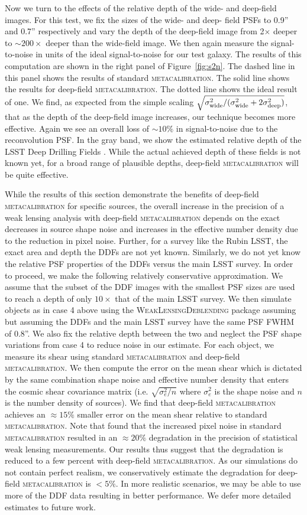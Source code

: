 \documentclass[twocolumn]{openjournal}
\makeatletter
\newcommand{\mcal}{\textsc{metacalibration}\@\xspace}
\newcommand{\descwl}{\textsc{WeakLensingDeblending}\@\xspace}
\makeatother
\begin{document}
Now we turn to the effects of the relative depth of the wide- and deep-field images. For
this test, we fix the sizes of the wide- and deep- field PSFs to 0.9'' and 0.7''
respectively and vary the depth of the deep-field image from 2$\times$ deeper to
$\sim200\times$ deeper than the wide-field image. We then again measure the
signal-to-noise in units of the ideal signal-to-noise for our test galaxy. The results
of this computation are shown in the right panel of Figure~\ref{fig:s2n}. The dashed
line in this panel shows the results of standard \mcal. The solid line shows the results
for deep-field \mcal. The dotted line shows the ideal result of one. We find, as
expected from the simple scaling
$\sqrt{\sigma^2_{\rm wide}/(\sigma^2_{\rm wide} + 2\sigma^2_{\rm deep})}$,
that as the depth of the deep-field image increases, our
technique becomes more effective. Again we see an overall loss of $\sim10\%$ in
signal-to-noise due to the reconvolution PSF. In the gray band, we show the estimated
relative depth of the LSST Deep Drilling Fields \citep[DDF,][]{lsst-ddf-depth}. While
the actual achieved depth of these fields is not known yet, for a broad range of
plausible depths, deep-field \mcal will be quite effective.

While the results of this section demonstrate the benefits of deep-field \mcal for
specific sources, the overall increase in the precision of a weak lensing analysis with
deep-field \mcal depends on the exact decreases in source shape noise and increases in
the effective number density due to the reduction in pixel noise. Further, for a survey
like the Rubin LSST, the exact area and depth the DDFs are not yet known. Similarly, we
do not yet know the relative PSF properties of the DDFs versus the main LSST survey. In
order to proceed, we make the following relatively conservative approximation. We assume
that the subset of the DDF images with the smallest PSF sizes are used to reach a depth
of only $10\times$ that of the main LSST survey. We then simulate objects as in case 4
above using the \descwl package assuming but assuming the DDFs and the main LSST survey
have the same PSF FWHM of 0.8''. We also fix the relative depth between the two and
neglect the PSF shape variations from case 4 to reduce noise in our estimate. For each
object, we measure its shear using standard \mcal and deep-field \mcal. We then compute
the error on the mean shear which is dictated by the same combination shape noise and
effective number density that enters the cosmic shear covariance matrix (i.e.
$\sqrt{\sigma_e^2/n}$ where $\sigma_e^2$ is the shape noise and $n$ is the number density
of sources). We find that deep-field \mcal achieves an $\approx15\%$ smaller
error on the mean shear relative to standard \mcal.  Note that
\citet{SheldonMcal2017} found that the increased pixel noise in standard
\mcal resulted in an $\approx 20\%$ degradation in the precision of
statistical weak lensing measurements.  Our results thus suggest that the degradation
is reduced to a few percent with deep-field \mcal.  As our simulations do
not contain perfect realism, we conservatively estimate the degradation for deep-field
\mcal is $<5\%$.  In more realistic scenarios, we may be able to use more of the DDF
data resulting in better performance. We defer more detailed estimates to future work.
\end{document}
